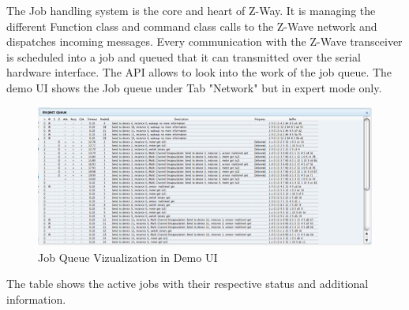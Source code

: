 The Job handling system is the core and heart of Z-Way. It is managing the different Function class and command class calls 
to the Z-Wave network and dispatches incoming messages. Every communication with the Z-Wave transceiver is scheduled 
into a job and queued that it can transmitted over the serial hardware interface. The API allows to look into the work of the job queue. 
The demo UI shows the Job queue under Tab "Network" but in expert  mode only.

\begin{figure} 
\begin{center}
\includegraphics[scale=0.9]{pics/jobqueue.png}
\caption{Job Queue Vizualization in Demo UI}
\end{center} 
\end{figure}

The table shows the active jobs with their respective status and additional information.

